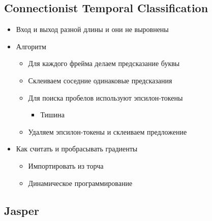 \documentclass[a4paper, 12pt]{article}
\begin{document}
\subsection{Connectionist Temporal
Classification}\label{connectionist-temporal-classification}

\begin{itemize}
\item
  
  Вход и выход разной длины и они не выровнены
  
\item
  
  {Алгоритм}
  

  \begin{itemize}
  \item
    
    Для каждого фрейма делаем предсказание буквы
    
  \item
    
    Склеиваем соседние одинаковые предсказания
    
  \item
    
    Для поиска пробелов используют эпсилон-токены
    

    \begin{itemize}
    \item
      
      Тишина
      
    \end{itemize}
  \item
    
    Удаляем эпсилон-токены и склеиваем предложение
    
  \end{itemize}
\item
  
  {Как считать и пробрасывать градиенты}
  

  \begin{itemize}
  \item
    
    Импортировать из торча
    
  \item
    
    Динамическое программирование
    
  \end{itemize}
\end{itemize}

\subsection{Jasper}\label{jasper}
\end{document}
